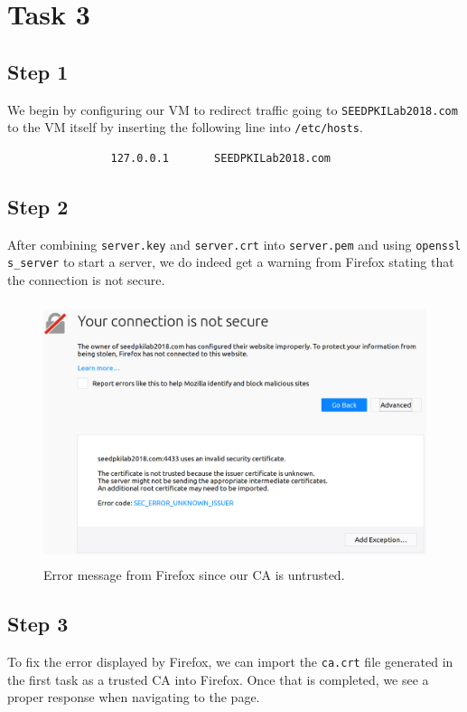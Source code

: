 \documentclass[12pt,letterpaper]{article}
\begin{document}
	\section*{Task 3}
		\subsection*{Step 1}
			We begin by configuring our VM to redirect traffic going to \texttt{SEEDPKILab2018.com} to the VM itself by inserting the following line into \texttt{/etc/hosts}.
			
			\begin{verbatim}
				127.0.0.1       SEEDPKILab2018.com
			\end{verbatim}
		
		\subsection*{Step 2}
			After combining \texttt{server.key} and \texttt{server.crt} into \texttt{server.pem} and using \texttt{openssl s\_server} to start a server, we do indeed get a warning from Firefox stating that the connection is not secure.
			
			\begin{figure}[h!]
				\begin{center}
					\includegraphics[height=3in]{task-3-2-untrusted}
				\end{center}
				\caption{Error message from Firefox since our CA is untrusted.}
			\end{figure}
		
		\subsection*{Step 3}
			To fix the error displayed by Firefox, we can import the \texttt{ca.crt} file generated in the first task as a trusted CA into Firefox. Once that is completed, we see a proper response when navigating to the page.
			
\end{document}
